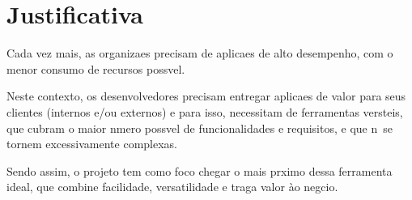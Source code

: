 \chapter{Justificativa}

\label{pro:justificativa}

Cada vez mais, as organiza\co es precisam de aplica\co es de alto desempenho, com o menor consumo de recursos poss\ih vel.

Neste contexto, os desenvolvedores precisam entregar aplica\co es de valor para seus clientes (internos e/ou externos) e para isso, necessitam de ferramentas vers\ah teis, que cubram o maior n\uh mero poss\ih vel de funcionalidades e requisitos, e que n\ao\ se tornem excessivamente complexas.

Sendo assim, o projeto tem como foco chegar o mais pr\oh ximo dessa ferramenta ideal, que combine facilidade, versatilidade e traga valor \`ao neg\oh cio.
